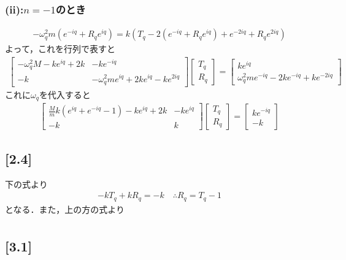 \documentclass[12pt,dvipdfmx]{jsarticle}
\begin{document}
\subsubsection*{(ii):$n=-1$のとき}
\begin{eqnarray}
  -\omega_q^2m \left( e^{-iq} + R_q e^{iq} \right) = k\left( T_q-2 \left( e^{-iq} + R_q e^{iq} \right) + e^{-2iq} + R_q e^{2iq} \right)
\end{eqnarray}
よって，これを行列で表すと
\begin{eqnarray}
  \begin{bmatrix}
    -\omega_q^2M -ke^{iq}+2k & -ke^{-iq} \\
    -k & -\omega_q^2 m e^{iq} + 2ke^{iq}-k e^{2iq}
  \end{bmatrix}
  \begin{bmatrix}
    T_q \\
    R_q
  \end{bmatrix}
  =
  \begin{bmatrix}
    ke^{iq} \\
    \omega_q^2 m e^{-iq} -2ke^{-iq}+k e^{-2iq}
  \end{bmatrix}
\end{eqnarray}
これに$\omega_q$を代入すると
\begin{eqnarray}
  \begin{bmatrix}
    \frac{M}{m}k(e^{iq}+e^{-iq}-1)-ke^{iq}+2k & -ke^{iq}\\
    -k & k 
  \end{bmatrix}
  \begin{bmatrix}
    T_q \\
    R_q
  \end{bmatrix} =
  \begin{bmatrix}
    ke^{-iq} \\
    -k
  \end{bmatrix}
\end{eqnarray}
\subsection*{\large{[2.4]}}
下の式より
\begin{eqnarray}
  -k T_q + kR_q = -k \quad\therefore R_q = T_q-1
\end{eqnarray}
となる．また，上の方の式より
\begin{eqnarray}
  
\end{eqnarray}
\subsection*{\large{[3.1]}}
\end{document}
